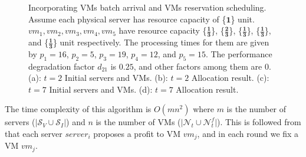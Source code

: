\documentclass[10pt,journal]{IEEEtran}
\begin{document}
\begin{figure}
\begin{tikzpicture}
\end{tikzpicture}
\caption{\label{fig:behaviour_IVP}Incorporating VMs batch arrival and VMs reservation scheduling. Assume each physical server has resource capacity of \{$\bm{1}$\} unit. $vm_1,vm_2,vm_3,vm_4,vm_5$ have resource capacity \{$\bm{\frac{1}{3}}$\}, \{$\bm{\frac{2}{3}}$\}, \{$\bm{\frac{1}{3}}$\}, \{$\bm{\frac{1}{3}}$\}, and \{$\bm{\frac{1}{3}}$\} unit respectively. The processing times for them are given by $p_1=16$, $p_2=5$, $p_3=19$, $p_4=12$, and $p_5=15$. The performance degradation factor $d_{21}$ is $0.25$, and other factors among them are $0$. (a): $t=2$ Initial servers and VMs. (b): $t=2$ Allocation result. (c): $t=7$ Initial servers and VMs. (d): $t=7$ Allocation result.}
\end{figure}

The time complexity of this algorithm is $O(mn^2)$ where $m$ is the number of servers ($\vert\mathcal{S}_{V}{\cup}\mathcal{S}_{I}\vert$) and $n$ is the number of VMs ($\vert\mathcal{N}_t{\cup}\mathcal{N}_t^f\vert$). This is followed from that each server $server_i$ proposes a profit to VM $vm_j$, and in each round we fix a VM $vm_j$.
\end{document}

